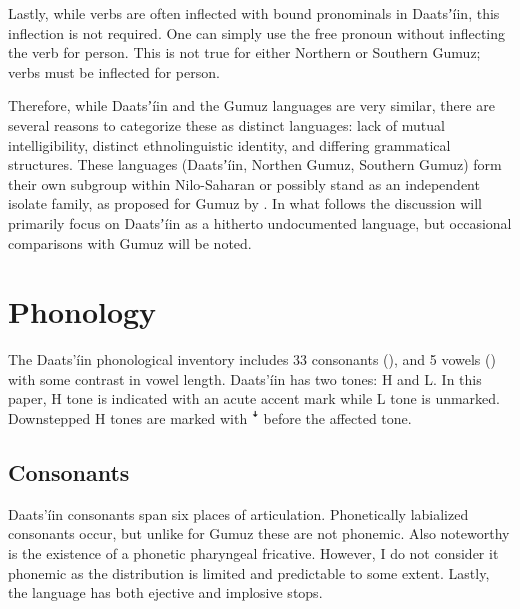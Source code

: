 \documentclass[output=paper]{langsci/langscibook}
\begin{document}
Lastly, while verbs are often inflected with bound pronominals in Daatsʼ\'{i}in, this inflection is not required. One can simply use the free pronoun without inflecting the verb for person. This is not true for either Northern or Southern Gumuz; verbs must be inflected for person.

Therefore, while Daatsʼ\'{i}in and the Gumuz languages are very similar, there are several reasons to categorize these as distinct languages: lack of mutual intelligibility, distinct ethnolinguistic identity, and differing grammatical structures. These languages (Daatsʼ\'{i}in, Northen Gumuz, Southern Gumuz) form their own subgroup within Nilo-Saharan or possibly stand as an independent isolate family, as proposed for Gumuz by \citet{Dimmendaal2011}. In what follows the discussion will primarily focus on Daatsʼ\'{i}in as a hitherto undocumented language, but occasional comparisons with Gumuz will be noted.


\section{Phonology}\label{sec:ahlandc:3}


The Daats’\'{i}in phonological inventory includes 33 consonants (), and 5 vowels () with some contrast in vowel length. Daats’\'{i}in has two tones: H and L. In this paper, H tone is indicated with an acute accent mark while L tone is unmarked. Downstepped H tones are marked with \textsf{ꜜ }before the affected tone.


\subsection{Consonants}\label{sec:ahlandc:3.1}

Daats’\'{i}in consonants span six places of articulation. Phonetically labialized consonants occur, but unlike for Gumuz these are not phonemic. Also noteworthy is the existence of a phonetic pharyngeal fricative. However, I do not consider it phonemic as the distribution is limited and predictable to some extent. Lastly, the language has both ejective and implosive stops.  
\end{document}
